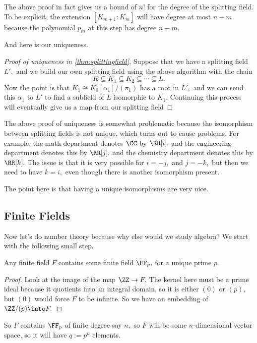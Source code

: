 \begin{remark}
	The above proof in fact gives us a bound of $n!$ for the degree of the splitting field. To be explicit, the extension $[K_{m+1}:K_m]$ will have degree at most $n-m$ because the polynomial $p_m$ at this step has degree $n-m.$
\end{remark}
And here is our uniqueness.
\begin{proof}[Proof of uniqueness in \autoref{thm:splittingfield}]
	Suppose that we have a splitting field $L',$ and we build our own splitting field using the above algorithm with the chain
	\[K\subseteq K_1\subseteq K_2\subseteq\cdots\subseteq L.\]
	Now the point is that $K_1\cong K_0[\alpha_1]/(\pi_1)$ has a root in $L',$ and we can send this $\alpha_1$ to $L'$ to find a subfield of $L$ isomorphic to $K_1.$ Continuing this process will eventually give us a map from our splitting field
\end{proof}
\begin{remark}
	The above proof of uniqueness is somewhat problematic because the isomorphism between splitting fields is not unique, which turns out to cause problems. For example, the math department denotes $\CC$ by $\RR[i],$ and the engineering department denotes this by $\RR[j],$ and the chemistry department denotes this by $\RR[k].$ The issue is that it is very possible for $i=-j,$ and $j=-k,$ but then we need to have $k=i,$ even though there is another isomorphism present.
\end{remark}
\begin{remark}
	The point here is that having a unique isomorphisms are very nice.
\end{remark}

\subsection{Finite Fields}
Now let's do number theory because why else would we study algebra? We start with the following small step.
\begin{proposition}
	Any finite field $F$ contains some finite field $\FF_p,$ for a unique prime $p.$
\end{proposition}
\begin{proof}
	Look at the image of the map $\ZZ\to F.$ The kernel here must be a prime ideal because it quotients into an integral domain, so it is either $(0)$ or $(p),$ but $(0)$ would force $F$ to be infinite. So we have an embedding of $\ZZ/(p)\into F.$
\end{proof}
So $F$ contains $\FF_p$ of finite degree say $n,$ so $F$ will be some $n$-dimensional vector space, so it will have $q:=p^n$ elements.

